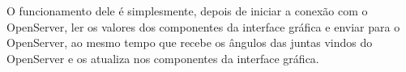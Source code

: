         O funcionamento dele é simplesmente, depois de iniciar a conexão com o OpenServer, ler os valores dos componentes da interface gráfica e enviar para o OpenServer, ao mesmo tempo que recebe os ângulos das juntas vindos do OpenServer e os atualiza nos componentes da interface gráfica.
        
